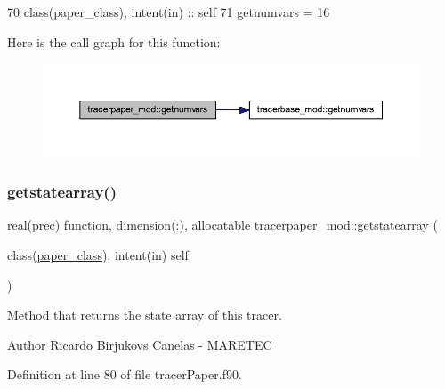 \begin{DoxyCode}
70     \textcolor{keywordtype}{class}(paper\_class), \textcolor{keywordtype}{intent(in)} :: self
71     getnumvars = 16
\end{DoxyCode}
Here is the call graph for this function\+:\nopagebreak
\begin{figure}[H]
\begin{center}
\leavevmode
\includegraphics[width=350pt]{namespacetracerpaper__mod_a62f88159b0746351f3b3a09a6a9dfff4_cgraph}
\end{center}
\end{figure}
\mbox{\label{namespacetracerpaper__mod_a703693333469e5091ec8de0a62171294}} 
\subsubsection{\texorpdfstring{getstatearray()}{getstatearray()}}
{\footnotesize\ttfamily real(prec) function, dimension(\+:), allocatable tracerpaper\+\_\+mod\+::getstatearray (\begin{DoxyParamCaption}\item[{class(\mbox{\hyperlink{structtracerpaper__mod_1_1paper__class}{paper\+\_\+class}}), intent(in)}]{self }\end{DoxyParamCaption})\hspace{0.3cm}{\ttfamily [private]}}



Method that returns the state array of this tracer. 

\begin{DoxyAuthor}{Author}
Ricardo Birjukovs Canelas -\/ M\+A\+R\+E\+T\+EC 
\end{DoxyAuthor}


Definition at line 80 of file tracer\+Paper.\+f90.


